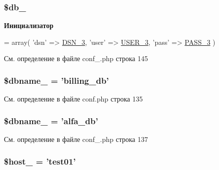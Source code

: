 \hypertarget{group___d_b__3_ga86a3d1ce31d6a69ea9c6b655a3fb10a1}{
\subsubsection[{\$db\-\_\-3}]{\setlength{\rightskip}{0pt plus 5cm}\$db\-\_}}\label{group___d_b__3_ga86a3d1ce31d6a69ea9c6b655a3fb10a1}
{\bfseries Инициализатор}
\begin{DoxyCode}
= array(
    \textcolor{stringliteral}{'dsn'} => \hyperlink{group___d_b__3_ga84e111746d69b14479dbf3f99b4e21ad}{DSN\_3},
    \textcolor{stringliteral}{'user'} => \hyperlink{group___d_b__3_gabb4d4077f995367d73794dcfd8c50a23}{USER\_3},
    \textcolor{stringliteral}{'pass'} => \hyperlink{group___d_b__3_gad7bf3ef090d7da2ae80f4a5f3ab4e67c}{PASS\_3}
)
\end{DoxyCode}


См. определение в файле conf\-\_\-.\-php строка 145

\hypertarget{group___d_b__3_ga0def194ad2413b876916149582a2b1e9}{
\subsubsection[{\$dbname\-\_\-3}]{\setlength{\rightskip}{0pt plus 5cm}\$dbname\-\_ = 'billing\-\_\-db'}}\label{group___d_b__3_ga0def194ad2413b876916149582a2b1e9}


См. определение в файле conf.\-php строка 135

\hypertarget{group___d_b__3_ga0def194ad2413b876916149582a2b1e9}{
\subsubsection[{\$dbname\-\_\-3}]{\setlength{\rightskip}{0pt plus 5cm}\$dbname\-\_ = 'alfa\-\_\-db'}}\label{group___d_b__3_ga0def194ad2413b876916149582a2b1e9}


См. определение в файле conf\-\_\-.\-php строка 137

\hypertarget{group___d_b__3_ga9782328ab4366de7daff22fe23704413}{
\subsubsection[{\$host\-\_\-3}]{\setlength{\rightskip}{0pt plus 5cm}\$host\-\_ = 'test01'}}\label{group___d_b__3_ga9782328ab4366de7daff22fe23704413}


